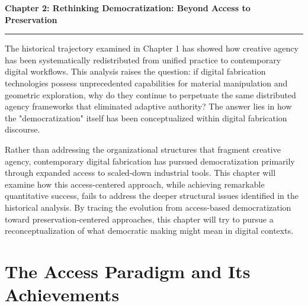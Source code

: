 \clearpage

\setcounter{chapter}{2}
\setcounter{section}{0}


\pagestyle{fancy}
\fancyhf{} %
\fancyfoot[C]{\thepage} %
\renewcommand{\headrulewidth}{0pt}
\renewcommand{\footrulewidth}{0pt}

\noindent
{\Large\textbf{Chapter 2: Rethinking Democratization: Beyond Access to Preservation}}
\vspace{0.3cm}
\hrule
\vspace{0.8cm}
\label{ch:democratization}

\setlength{\parindent}{0pt}

The historical trajectory examined in Chapter 1 has showed how creative agency has been systematically redistributed from unified practice to contemporary digital workflows. This analysis raises the question: if digital fabrication technologies possess unprecedented capabilities for material manipulation and geometric exploration, why do they continue to perpetuate the same distributed agency frameworks that eliminated adaptive authority? The answer lies in how the "democratization" itself has been conceptualized within digital fabrication discourse.

\vspace{0.5cm}

Rather than addressing the organizational structures that fragment creative agency, contemporary digital fabrication has pursued democratization primarily through expanded access to scaled-down industrial tools. This chapter will examine how this access-centered approach, while achieving remarkable quantitative success, fails to address the deeper structural issues identified in the historical analysis. By tracing the evolution from access-based democratization toward preservation-centered approaches, this chapter will try to pursue a reconceptualization of what democratic making might mean in digital contexts.

\section{The Access Paradigm and Its Achievements}

